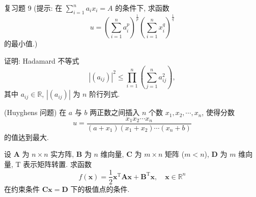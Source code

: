\begin{exblock}{复习题 9}
  (提示: 在 $\sum\limits_{i=1}^{n} a_{i}x_{i} = A$ 的条件下, 求函数
  \[
    u = \left(\sum_{i=1}^{n} a_{i}^{p}\right)^{\frac{1}{p}}\left(\sum_{i=1}^{n} x_{i}^{q}\right)^{\frac{1}{q}}
  \]
  的最小值.)

  \item 证明: Hadamard 不等式
  \[
    |(a_{ij})|^{2} \leqslant \prod_{i=1}^{n}\left(\sum_{j=1}^{n} a_{ij}^{2}\right),
  \]
  其中 $a_{ij} \in \mathbb{R}$, $|(a_{ij})|$ 为 $n$ 阶行列式.

  \item (Huyghens 问题) 在 $a$ 与 $b$ 两正数之间插入 $n$ 个数 $x_{1}, x_{2}, \cdots, x_{n}$, 使得分数
  \[
    u = \frac{x_{1}x_{2}\cdots x_{n}}{(a + x_{1})(x_{1} + x_{2})\cdots(x_{n} + b)}
  \]
  的值达到最大.

  \item 设 $\boldsymbol{A}$ 为 $n \times n$ 实方阵, $\boldsymbol{B}$ 为 $n$ 维向量, $\boldsymbol{C}$ 为 $m \times n$ 矩阵 ($m < n$), $\boldsymbol{D}$ 为 $m$ 维向量, $\mathrm{T}$ 表示矩阵转置. 求函数
  \[
    f(\boldsymbol{x}) = \frac{1}{2}\boldsymbol{x}^{\mathrm{T}}\boldsymbol{A}\boldsymbol{x} + \boldsymbol{B}^{\mathrm{T}}\boldsymbol{x}, \quad \boldsymbol{x} \in \mathbb{R}^{n}
  \]
  在约束条件 $\boldsymbol{C}\boldsymbol{x} = \boldsymbol{D}$ 下的极值点的条件.
\end{exblock}
